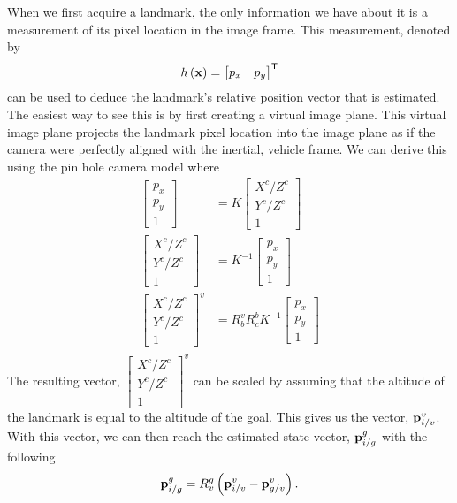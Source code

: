 When we first acquire a landmark, the only information we have about it is a
measurement of its pixel location in the image frame. This measurement, denoted
by
\begin{equation}
  h \left( \boldsymbol{\mathrm{x}} \right) = 
  \begin{bmatrix}
    p_x & p_y
  \end{bmatrix}^{\mathsf{T}}
\end{equation}
can be used to deduce the landmark's relative position vector that is estimated.
The easiest way to see this is by first creating a virtual image plane. This
virtual image plane projects the landmark pixel location into the image plane as
if the camera were perfectly aligned with the inertial, vehicle frame. We can
derive this using the pin hole camera model where
\begin{align}
  \begin{bmatrix}
    p_x \\ p_y \\ 1
  \end{bmatrix} &= K
  \begin{bmatrix}
    X^c / Z^c \\
    Y^c / Z^c \\
    1
  \end{bmatrix} \\
  \begin{bmatrix}
    X^c / Z^c \\
    Y^c / Z^c \\
    1
  \end{bmatrix}
   &= K^{-1}
  \begin{bmatrix}
    p_x \\ p_y \\ 1
  \end{bmatrix} \\
  \begin{bmatrix}
    X^c / Z^c \\
    Y^c / Z^c \\
    1
  \end{bmatrix}^v
   &= R_b^v R_c^b K^{-1}
  \begin{bmatrix}
    p_x \\ p_y \\ 1
  \end{bmatrix} \\
\end{align}
The resulting vector, $
  \begin{bmatrix}
    X^c / Z^c \\
    Y^c / Z^c \\
    1
  \end{bmatrix}^v$
can be scaled by assuming that the altitude of the landmark is equal to the
altitude of the goal. This gives us the vector, $\boldsymbol{\mathrm{p}}_{i/v}^v$.
With this vector, we can then reach the estimated state vector,
$\boldsymbol{\mathrm{p}}_{i/g}^g$ with the following
\begin{equation}
  \boldsymbol{\mathrm{p}}_{i/g}^g = R_v^g \left( \boldsymbol{\mathrm{p}}_{i/v}^v - \boldsymbol{\mathrm{p}}_{g/v}^v \right).
\end{equation}

